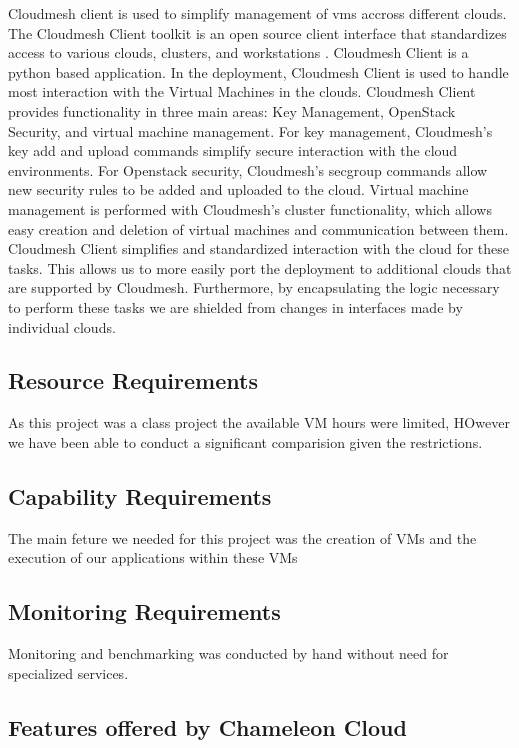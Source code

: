 \documentclass[sigconf]{acmart}
\begin{document}
Cloudmesh client is used to simplify management of vms accross
different clouds.  The Cloudmesh Client toolkit is an open source
client interface that standardizes access to various clouds, clusters,
and workstations \cite{www-cloudmesh}.  Cloudmesh Client is a python
based application. In the deployment, Cloudmesh Client is used to
handle most interaction with the Virtual Machines in the
clouds. Cloudmesh Client provides functionality in three main areas:
Key Management, OpenStack Security, and virtual machine management.
For key management, Cloudmesh's key add and upload commands simplify
secure interaction with the cloud environments.  For Openstack
security, Cloudmesh's secgroup commands allow new security rules to be
added and uploaded to the cloud.  Virtual machine management is
performed with Cloudmesh's cluster functionality, which allows easy
creation and deletion of virtual machines and communication between
them.  Cloudmesh Client simplifies and standardized interaction with
the cloud for these tasks.  This allows us to more easily port the
deployment to additional clouds that are supported by Cloudmesh.
Furthermore, by encapsulating the logic necessary to perform these
tasks we are shielded from changes in interfaces made by individual
clouds.

\subsection{Resource Requirements}

As this project was a class project the available VM hours were
limited, HOwever we have been able to conduct a significant
comparision given the restrictions.

\subsection{Capability Requirements}

The main feture we needed for this project was the creation of VMs and
the execution of our applications within these VMs

\subsection{Monitoring Requirements}

Monitoring and benchmarking was conducted by hand without need for
specialized services. 

\subsection{Features offered by Chameleon Cloud}
\end{document}
